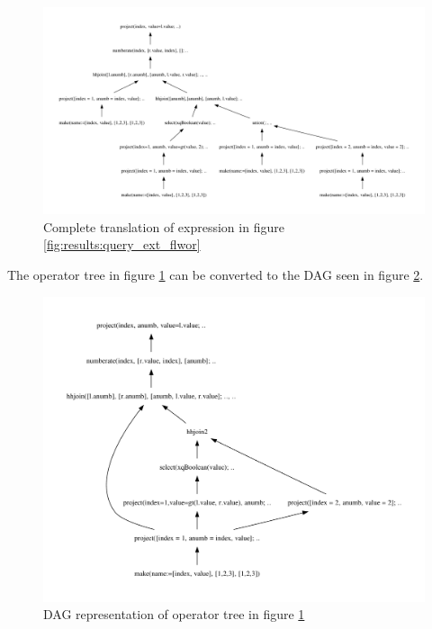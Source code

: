 \begin{figure}[!htp]
\begin{center}
  \includegraphics[width=1.0\textwidth]{img/graphs/ext_flwor}
  \caption{Complete translation of expression in figure
  \ref{fig:results:query_ext_flwor}}
  \label{fig:results:query_ext_flwor_result}
\end{center}
\end{figure}

The operator tree in figure \ref{fig:results:query_ext_flwor_result} can be
converted to the DAG seen in figure \ref{fig:results:query_ext_flwor_dag}.

\newpage

\begin{figure}[!htp]
\begin{center}
  \includegraphics[width=1.0\textwidth]{img/graphs/ext_flwor_dag}
  \caption{DAG representation of operator tree in figure
  \ref{fig:results:query_ext_flwor_result}}
  \label{fig:results:query_ext_flwor_dag}
\end{center}
\end{figure}

